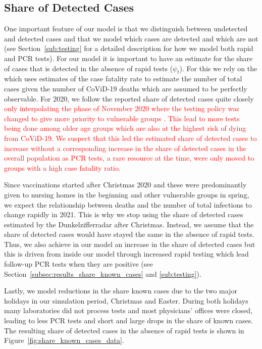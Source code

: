\subsection{Share of Detected Cases}
\label{subsec:data_share_known_cases}


One important feature of our model is that we distinguish between undetected and detected
cases and that we model which cases are detected and which are not (see
Section~\ref{sub:testing} for a detailed description for how we model both rapid and PCR
tests). For our model it is important to have an estimate for the share of cases that is
detected in the absence of rapid tests ($\psi_t$). For this we rely on the
\cite[Dunkelzifferradar Project][]{Dunkelzifferradar2020} which uses estimates of the case
fatality rate to estimate the number of total cases given the number of CoViD-19 deaths
which are assumed to be perfectly observable. For 2020, we follow the reported share of
detected cases quite closely \textcolor{red}{only interpolating the phase of November
2020 where the testing policy was changed to give more priority to vulnerable groups
\citep{RKI2020a}. This lead to more tests being done among older age groups which are
also at the highest risk of dying from CoViD-19. We suspect that this led the estimated
share of detected cases to increase without a corresponding increase in the share of
detected cases in the overall population as PCR tests, a rare resource at the time, were
only moved to groups with a high case fatality ratio.}

Since vaccinations started after Christmas 2020 and these were predominantly given to
nursing homes in the beginning and other vulnerable groups in spring, we expect the
relationship between deaths and the number of total infections to change rapidly in 2021.
This is why we stop using the share of detected cases estimated by the Dunkelzifferradar
after Christmas. Instead, we assume that the share of detected cases would have stayed
the same in the absence of rapid tests. Thus, we also achieve in our model an increase in
the share of detected cases but this is driven from inside our model through increased
rapid testing which lead follow-up PCR tests when they are positive (see
Section~\ref{subsec:results_share_known_cases} and \ref{sub:testing}).

Lastly, we model reductions in the share known cases due to the two major holidays in our
simulation period, Christmas and Easter. During both holidays many laboratories did not
process tests and most physicians' offices were closed, leading to less PCR tests and
short and large drops in the share of known cases. The resulting share of detected cases
in the absence of rapid tests is shown in Figure~\ref{fig:share_known_cases_data}.

